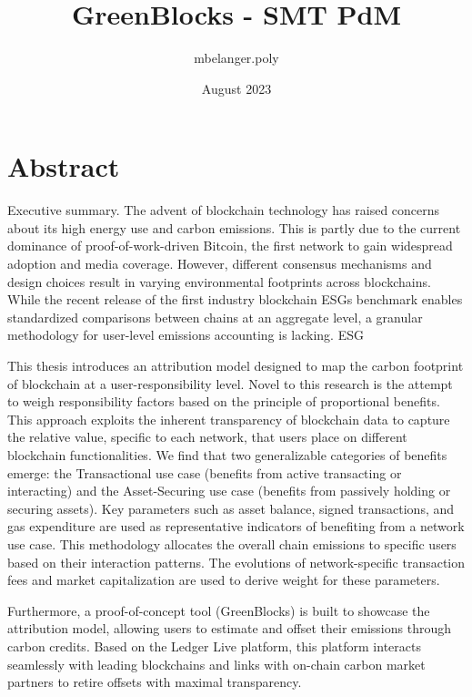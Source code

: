\documentclass[11pt]{report}
\title{GreenBlocks - SMT PdM}
\author{mbelanger.poly}
\date{August 2023}
\begin{document}

\section*{Abstract}

Executive summary.
The advent of blockchain technology has raised concerns about its high energy use and carbon emissions. This is partly due to the current dominance of proof-of-work-driven Bitcoin, the first network to gain widespread adoption and media coverage. However, different consensus mechanisms and design choices result in varying environmental footprints across blockchains. While the recent release of the first industry blockchain \acp{ESG} benchmark enables standardized comparisons between chains at an aggregate level, a granular methodology for user-level emissions accounting is lacking. \ac{ESG} \

This thesis introduces an attribution model designed to map the carbon footprint of blockchain at a user-responsibility level. Novel to this research is the attempt to weigh responsibility factors based on the principle of proportional benefits. This approach exploits the inherent transparency of blockchain data to capture the relative value, specific to each network, that users place on different blockchain functionalities. We find that two generalizable categories of benefits emerge: the Transactional use case (benefits from active transacting or interacting) and the Asset-Securing use case (benefits from passively holding or securing assets). Key parameters such as asset balance, signed transactions, and gas expenditure are used as representative indicators of benefiting from a network use case. This methodology allocates the overall chain emissions to specific users based on their interaction patterns. The evolutions of network-specific transaction fees and market capitalization are used to derive weight for these parameters.


Furthermore, a proof-of-concept tool (GreenBlocks) is built to showcase the attribution model, allowing users to estimate and offset their emissions through carbon credits. Based on the Ledger Live platform, this platform interacts seamlessly with leading blockchains and links with on-chain carbon market partners to retire offsets with maximal transparency.
\end{document}
